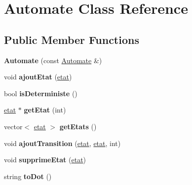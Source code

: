 \hypertarget{class_automate}{\section{Automate Class Reference}
\label{class_automate}
}
\subsection*{Public Member Functions}
\begin{DoxyCompactItemize}
\item 
\hypertarget{class_automate_acfb8d2af5feb86ac7c8df6dc6994646c}{{\bfseries Automate} (const \hyperlink{class_automate}{Automate} \&)}\label{class_automate_acfb8d2af5feb86ac7c8df6dc6994646c}

\item 
\hypertarget{class_automate_a2374e1ba1527ebcb47fae239906bd01e}{void {\bfseries ajout\-Etat} (\hyperlink{classetat}{etat})}\label{class_automate_a2374e1ba1527ebcb47fae239906bd01e}

\item 
\hypertarget{class_automate_a6b63a438c3e8af81e2cdf8493a949232}{bool {\bfseries is\-Deterministe} ()}\label{class_automate_a6b63a438c3e8af81e2cdf8493a949232}

\item 
\hypertarget{class_automate_ae0c96b5f7e0eb1df5584de9fabc3d2da}{\hyperlink{classetat}{etat} $\ast$ {\bfseries get\-Etat} (int)}\label{class_automate_ae0c96b5f7e0eb1df5584de9fabc3d2da}

\item 
\hypertarget{class_automate_a656b9bc8d5daedee113b6429662b5d98}{vector$<$ \hyperlink{classetat}{etat} $>$ {\bfseries get\-Etats} ()}\label{class_automate_a656b9bc8d5daedee113b6429662b5d98}

\item 
\hypertarget{class_automate_a92bf8eb49b9948aa01043fa1c3b7c294}{void {\bfseries ajout\-Transition} (\hyperlink{classetat}{etat}, \hyperlink{classetat}{etat}, int)}\label{class_automate_a92bf8eb49b9948aa01043fa1c3b7c294}

\item 
\hypertarget{class_automate_a626a7f669fb0c76e42372cc868f151ed}{void {\bfseries supprime\-Etat} (\hyperlink{classetat}{etat})}\label{class_automate_a626a7f669fb0c76e42372cc868f151ed}

\item 
\hypertarget{class_automate_af1f2f1cd64780ff7b302936787aeac38}{string {\bfseries to\-Dot} ()}\label{class_automate_af1f2f1cd64780ff7b302936787aeac38}


\end{DoxyCompactItemize}
